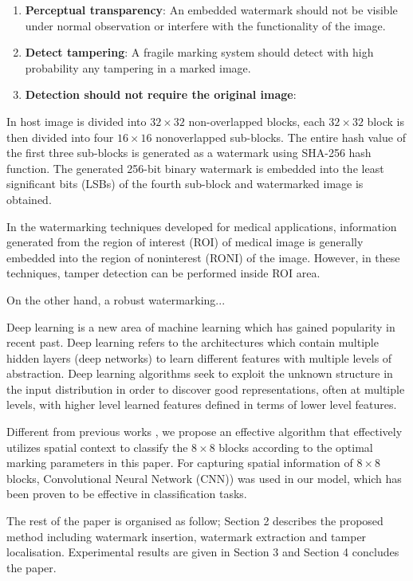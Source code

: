 \documentclass[runningheads]{llncs}
\begin{document}
\begin{enumerate}
	\item \textbf{Perceptual transparency}: An embedded watermark should not be visible under normal observation or interfere	with the functionality of the image.
	\item \textbf{Detect tampering}: A fragile marking system should detect with high probability any tampering in a marked image.
	\item \textbf{Detection should not require the original image}:
\end{enumerate}

In \cite{gul2019novel} host image is divided into $32\times 32$ non-overlapped blocks, each $32\times 32$ block is then divided into four $16\times 16$ nonoverlapped sub-blocks. The entire hash value of the first three sub-blocks is generated as a watermark using SHA-256 hash function. The generated 256-bit binary watermark is embedded into the least significant bits (LSBs) of the fourth sub-block and watermarked image is obtained.

In the watermarking techniques developed for medical applications, information generated from the region of interest (ROI) of medical image is generally embedded into the region of noninterest (RONI) of the image. However, in these
techniques, tamper detection can be performed inside ROI area.

On the other hand, a robust watermarking...

Deep learning is a new area of machine learning which has gained popularity in recent past. Deep learning refers to the architectures which contain multiple hidden layers (deep networks) to learn different features with multiple levels of abstraction. Deep learning algorithms seek to exploit the unknown structure in the input distribution in order to discover good representations, often at multiple levels, with higher level learned features defined in terms of lower level features. \cite{wani2019advances}

Different from previous works \cite{avila2018watermarking}, we propose an effective algorithm that effectively utilizes spatial context to classify the $8\times 8$ blocks according to the optimal marking parameters in this paper. For capturing spatial information of $8\times 8$ blocks, Convolutional Neural Network (CNN)) was used in our model, which has been proven to be effective in classification tasks.

The rest of the paper is organised as follow; Section 2 describes the proposed method including watermark insertion, watermark extraction and tamper localisation. Experimental results are given in Section 3 and Section 4 concludes the paper.
\end{document}
